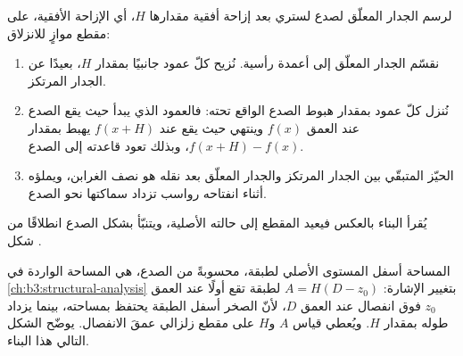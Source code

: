\begin{method}\label{met:b3:extension-strike-slip:heave}
لرسم الجدار المعلّق لصدع لستري بعد إزاحة أفقية مقدارها
$H$، أي الإزاحة الأفقية، على مقطع موازٍ للانزلاق:
\begin{enumerate}
  \item نقسّم الجدار المعلّق إلى أعمدة رأسية. نُزيح كلّ عمود جانبيًا
        بمقدار $H$، بعيدًا عن الجدار المرتكز.
  \item نُنزل كلّ عمود بمقدار هبوط الصدع الواقع تحته: فالعمود الذي
        يبدأ حيث يقع الصدع عند العمق $f(x)$ وينتهي حيث يقع عند
        $f(x + H)$ يهبط بمقدار $f(x + H) - f(x)$، وبذلك تعود قاعدته
        إلى الصدع.
  \item الحيّز المتبقّي بين الجدار المرتكز والجدار المعلّق بعد نقله هو
        نصف الغرابن، ويملؤه أثناء انفتاحه رواسب تزداد سماكتها نحو
        الصدع.
\end{enumerate}
يُقرأ البناء بالعكس فيعيد المقطع إلى حالته الأصلية، ويتنبّأ بشكل
الصدع انطلاقًا من شكل .
\end{method}

المساحة أسفل المستوى الأصلي لطبقة، محسوبةً من الصدع، هي المساحة الواردة في
\cref{ch:b3:structural-analysis} بتغيير الإشارة: $A =
H(D - z_0)$ لطبقة تقع أولًا عند العمق $z_0$ فوق انفصال عند العمق
$D$، لأنّ الصخر أسفل الطبقة يحتفظ بمساحته، بينما يزداد طوله بمقدار
$H$. ويُعطي قياس $A$ و$H$ على مقطع زلزالي
عمقَ الانفصال. يوضّح الشكل التالي هذا البناء.

